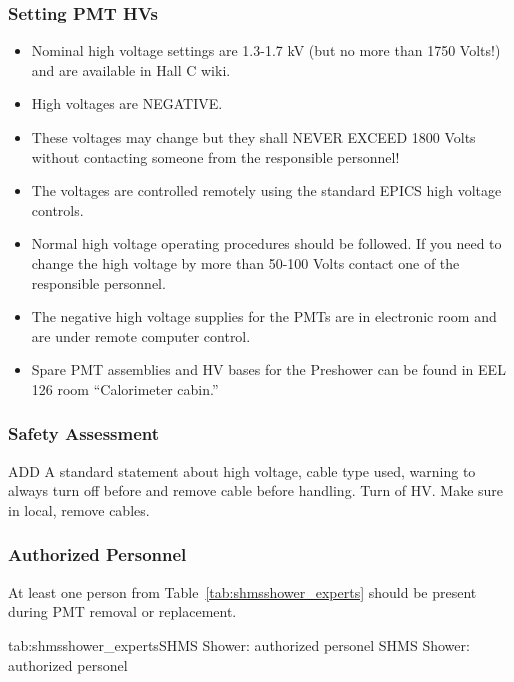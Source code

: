 \subsubsection*{Setting PMT HVs}
\begin{itemize}
\item Nominal high voltage settings are 1.3-1.7 kV (but no more than
  1750 Volts!)  and are available in Hall C wiki.
\item High voltages are NEGATIVE. 
\item These voltages may change but they shall NEVER EXCEED 1800 Volts
  without contacting someone from the responsible personnel!
\item The voltages are controlled remotely using the standard EPICS high voltage controls.
\item Normal high voltage operating procedures should be followed. If
  you need to change the high voltage by more than 50-100 Volts
  contact one of the responsible personnel.
\item The negative high voltage supplies for the PMTs are in
  electronic room and are under remote computer control.
\item Spare PMT assemblies and HV bases for the Preshower can be
  found in EEL 126 room ``Calorimeter cabin.''
\end{itemize}

\begin{safetyen}{0}{0}

\subsubsection{Safety Assessment}

ADD A standard statement about high voltage, cable type used, warning
to always turn off before and remove cable before handling.  
Turn of HV.  Make sure in local, remove cables.


\subsubsection{Authorized Personnel}
At least one person from Table~\ref{tab:shmsshower_experts} should be
present during PMT removal or replacement.

\begin{namestab}{tab:shmsshower_experts}{SHMS Shower: authorized personel}{
    SHMS Shower: authorized personel}
  \ArshakAsaturyan{}
  \VardanTadevosyan{}
  \HamletMkrtchyan{}
  \ArthurMkrtchyan{}
\end{namestab}

\end{safetyen}

